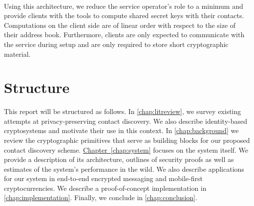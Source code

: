\paragraph{} Using this architecture, we reduce the service operator's role to a minimum and provide clients with the tools to compute shared secret keys with their contacts. Computations on the client side are of linear order with respect to the size of their address book. Furthermore, clients are only expected to communicate with the service during setup and are only required to store short cryptographic material.



\section{Structure}

\paragraph{} This report will be structured as follows. In \autoref{chap:litreview}, we survey existing attempts at privacy-preserving contact discovery. We also describe identity-based cryptosystems and motivate their use in this context. In \autoref{chap:background} we review the cryptographic primitives that serve as building blocks for our proposed contact discovery scheme. \hyperref[chap:system]{Chapter~\ref*{chap:system}} focuses on the system itself. We provide a description of its architecture, outlines of security proofs as well as estimates of the system's performance in the wild. We also describe applications for our system in end-to-end encrypted messaging and mobile-first cryptocurrencies. We describe a proof-of-concept implementation in \autoref{chap:implementation}.  Finally, we conclude in \autoref{chap:conclusion}.




























